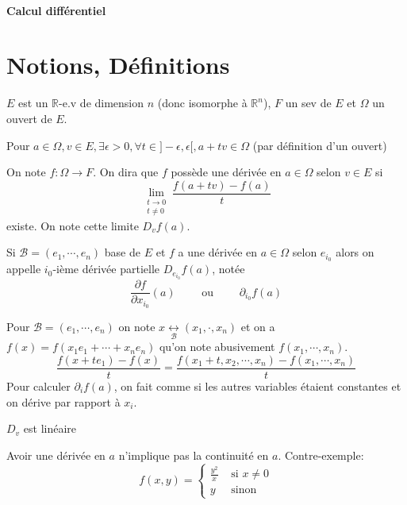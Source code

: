\ifsolo
~

\vspace{1cm}

\begin{center}
\textbf{\LARGE Calcul différentiel} \\[1em]
\end{center}
\tableofcontents
\else
\minitoc
\fi
\thispagestyle{empty}

\ifsolo \newpage \setcounter{page}{1} \fi
\section{Notions, Définitions}

$E$ est un $\mathbb R$-e.v de dimension $n$ (donc isomorphe à $\mathbb R^n$), $F$ un sev de $E$ et $\Omega$ un ouvert de $E$.

\begin{rem}
Pour $a\in\Omega, v\in E, \exists \epsilon>0, \forall t\in ]-\epsilon, \epsilon[, a+tv\in\Omega$ (par définition d'un ouvert)
\end{rem}

\begin{dfn}
On note $f:\Omega \longrightarrow F$. On dira que $f$ possède une dérivée en $a\in\Omega$ selon $v\in E$ si \[
    \lim_{\substack{t\to 0\\ t\neq 0}}\frac{f(a+tv)-f(a)}t
\] existe. On note cette limite $D_vf(a)$.

Si $\mathcal B=(e_1,\cdots, e_n)$ base de $E$ et $f$ a une dérivée en $a\in\Omega$ selon $e_{i_0}$ alors on appelle $i_0$-ième dérivée partielle $D_{e_{i_0}}f(a)$, notée \[
    \frac{\partial f}{\partial x_{i_0}}(a)\qquad \text{ ou }\qquad \partial_{i_0}f(a)
\]
\end{dfn}

\begin{rem}
Pour $\mathcal B=(e_1, \cdots, e_n)$ on note $x\underset{\mathcal B}{\longleftrightarrow}(x_1, \cdot, x_n)$ et on a $f(x)=f(x_1e_1+\cdots + x_ne_n)$ qu'on note abusivement $f(x_1, \cdots, x_n)$. \[
    \frac{f(x+te_1)-f(x)}{t}=\frac{f(x_1+t, x_2, \cdots, x_n)-f(x_1, \cdots, x_n)}{t}
\]
Pour calculer $\partial_if(a)$, on fait comme si les autres variables étaient constantes et on dérive par rapport à $x_i$.
\end{rem}

\begin{rem}
$D_v$ est linéaire
\end{rem}

\begin{rem}
Avoir une dérivée en $a$ n'implique pas la continuité en $a$. Contre-exemple: \[
    f(x, y)=\begin{cases}
    \frac{y^2}x &\text{ si }x\neq 0\\ y & \text{ sinon}
    \end{cases}
\]
\end{rem}

